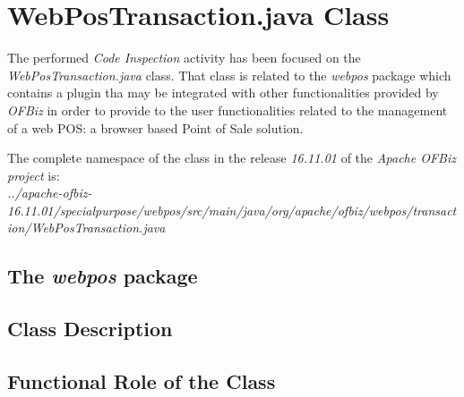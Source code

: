 \section{WebPosTransaction.java Class}
The performed \emph{Code Inspection} activity has been focused on the \emph{WebPosTransaction.java} class. That class is related to the \textit{webpos} package which contains a plugin tha may be integrated with other functionalities provided by \textit{OFBiz} in order to provide to the user functionalities related to the management of a web POS: a browser based Point of Sale solution.

The complete namespace of the class in the release \emph{16.11.01} of the \emph{Apache OFBiz project} is:\\

\emph{../apache-ofbiz-16.11.01/specialpurpose/webpos/src/main/java/org/apache/ofbiz/webpos/transaction/WebPosTransaction.java}

\subsection{The \textit{webpos} package}
\subsection{Class Description}
\subsection{Functional Role of the Class}
